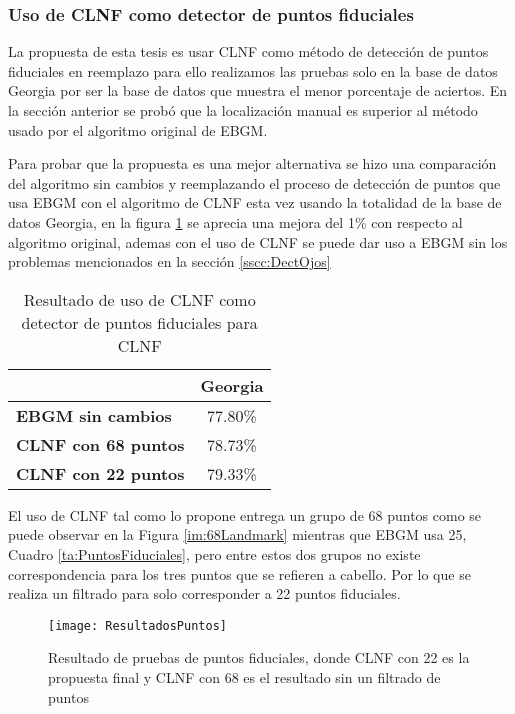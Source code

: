 \subsubsection{Uso de \ac{CLNF} como detector de puntos fiduciales}
La propuesta de esta tesis es usar \ac{CLNF} como método de detección de puntos fiduciales en reemplazo para ello realizamos las pruebas solo en la base de datos Georgia por ser la base de datos que muestra el menor porcentaje de aciertos. En la sección anterior se probó que la localización manual es superior al método usado por el algoritmo original de \ac{EBGM}.

Para probar que la propuesta es una mejor alternativa se hizo una comparación del algoritmo sin cambios y reemplazando el proceso de detección de puntos que usa \ac{EBGM} con el algoritmo de \ac{CLNF} esta vez usando la totalidad de la base de datos Georgia, en la figura \ref{im:ResultadosPuntos} se aprecia una mejora del 1\% con respecto al algoritmo original, ademas con el uso de \ac{CLNF} se puede dar uso a \ac{EBGM} sin los problemas mencionados en la sección \ref{sscc:DectOjos} 

\begin{table}[h]
\centering
\caption{Resultado de uso de \ac{CLNF} como detector de puntos fiduciales para \ac{CLNF}}
\label{ta:ResultadosPuntos}
\begin{tabular}{|l|c|}
\hline
\textbf{}                   & \textbf{Georgia} \\ \hline
\textbf{EBGM sin cambios}   & 77.80\%          \\ \hline
\textbf{CLNF con 68 puntos} & 78.73\%          \\ \hline
\textbf{CLNF con 22 puntos} & 79.33\%          \\ \hline
\end{tabular}
\end{table}


El uso de \ac{CLNF} tal como lo propone \cite{baltrusaitis2013constrained} entrega un grupo de 68 puntos como se puede observar en la Figura \ref{im:68Landmark} mientras que \ac{EBGM} usa 25, Cuadro \ref{ta:PuntosFiduciales}, pero entre estos dos grupos no existe correspondencia para los tres puntos que se refieren a cabello. Por lo que se realiza un filtrado para solo corresponder a 22 puntos fiduciales.

\begin{figure}[h]
    \centering
    \texttt{[image: ResultadosPuntos]}
    \caption{Resultado de pruebas de puntos fiduciales, donde \ac{CLNF} con 22 es la propuesta final y \ac{CLNF} con 68 es el resultado sin un filtrado de puntos}
    \label{im:ResultadosPuntos}
\end{figure}

